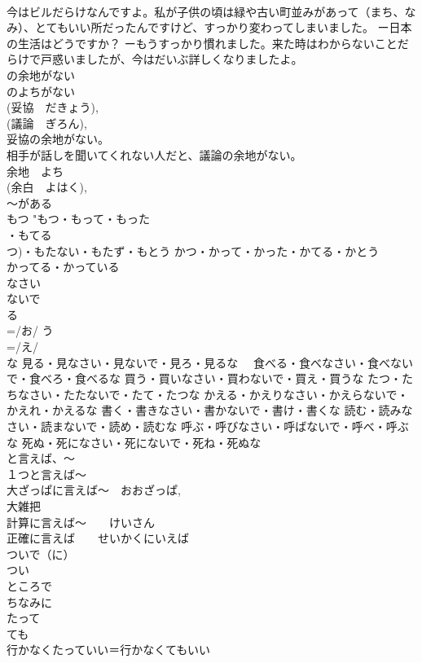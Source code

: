 \documentclass[8pt]{extreport}
\begin{document}
\begin{CJK}{UTF8}{min}
\\	今はビルだらけなんですよ。私が子供の頃は緑や古い町並みがあって（まち、なみ）、とてもいい所だったんですけど、すっかり変わってしまいました。 ー日本の生活はどうですか？ ーもうすっかり慣れました。来た時はわからないことだらけで戸惑いましたが、今はだいぶ詳しくなりましたよ。
\\	の余地がない	
\\	のよちがない 
\\	(妥協　だきょう), 
\\	(議論　ぎろん), 
\\	妥協の余地がない。 
\\	相手が話しを聞いてくれない人だと、議論の余地がない。 
\\	余地　よち 
\\	(余白　よはく), 
\\	～がある 
\\	もつ	"もつ・もって・もった
\\	・もてる
\\	つ)・もたない・もたず・もとう かつ・かって・かった・かてる・かとう 
\\	かってる・かっている 
\\	なさい 
\\	ないで 
\\	る
\\	=/お/ う
\\	=/え/ 
\\	な 見る・見なさい・見ないで・見ろ・見るな　 食べる・食べなさい・食べないで・食べろ・食べるな 買う・買いなさい・買わないで・買え・買うな たつ・たちなさい・たたないで・たて・たつな かえる・かえりなさい・かえらないで・かえれ・かえるな 書く・書きなさい・書かないで・書け・書くな 読む・読みなさい・読まないで・読め・読むな 呼ぶ・呼びなさい・呼ばないで・呼べ・呼ぶな 死ぬ・死になさい・死にないで・死ね・死ぬな
\\	と言えば、～	
\\	１つと言えば～ 
\\	大ざっぱに言えば～　おおざっぱ, 
\\	大雑把 
\\	計算に言えば～　　けいさん 
\\	正確に言えば　　せいかくにいえば 
\\	ついで（に） 
\\	つい 
\\	ところで 
\\	ちなみに 
\\	たって	
\\	ても 
\\	行かなくたっていい＝行かなくてもいい

\end{CJK}
\end{document}
